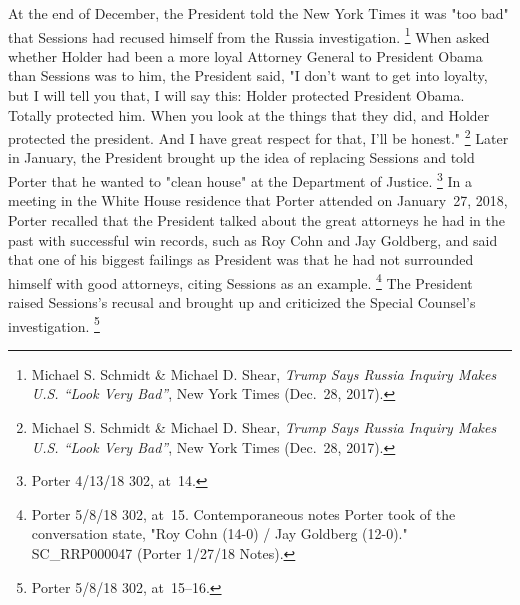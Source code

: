 At the end of December, the President told the New York Times it was "too bad" that Sessions had recused himself from the Russia investigation.%
\footnote{Michael S. Schmidt \& Michael D. Shear, \textit{Trump Says Russia Inquiry Makes U.S. ``Look Very Bad''}, New York Times (Dec.~28, 2017).}
When asked whether Holder had been a more loyal Attorney General to President Obama than Sessions was to him, the President said, "I don't want to get into loyalty, but I will tell you that, I will say this: Holder protected President Obama.
Totally protected him.
When you look at the things that they did, and Holder protected the president.
And I have great respect for that, I'll be honest."%
\footnote{Michael S. Schmidt \& Michael D. Shear, \textit{Trump Says Russia Inquiry Makes U.S. ``Look Very Bad''}, New York Times (Dec.~28, 2017).}
Later in January, the President brought up the idea of replacing Sessions and told Porter that he wanted to "clean house" at the Department of Justice.%
\footnote{Porter 4/13/18 302, at~14.}
In a meeting in the White House residence that Porter attended on January~27, 2018, Porter recalled that the President talked about the great attorneys he had in the past with successful win records, such as Roy Cohn and Jay Goldberg, and said that one of his biggest failings as President was that he had not surrounded himself with good attorneys, citing Sessions as an example.%
\footnote{Porter 5/8/18 302, at~15.
Contemporaneous notes Porter took of the conversation state, "Roy Cohn (14-0) / Jay Goldberg (12-0)."
SC\_RRP000047 (Porter 1/27/18 Notes).}
The President raised Sessions's recusal and brought up and criticized the Special Counsel's investigation.%
\footnote{Porter 5/8/18 302, at~15--16.}

